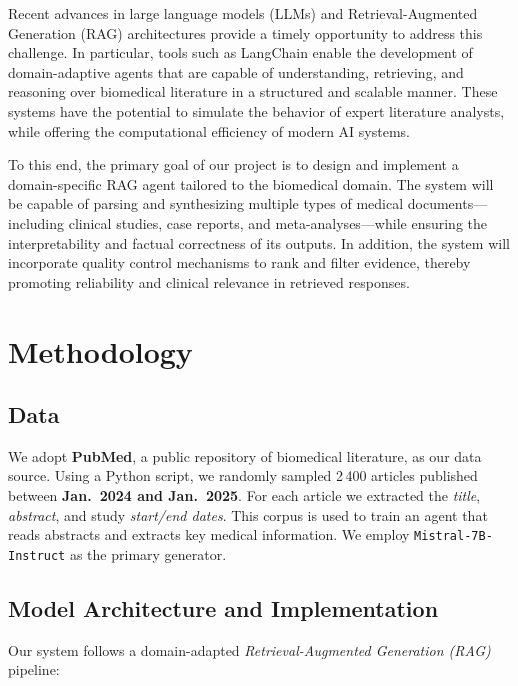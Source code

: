\documentclass[conference]{IEEEtran}
\begin{document}
Recent advances in large language models (LLMs) and Retrieval-Augmented Generation (RAG) architectures provide a timely opportunity to address this challenge. In particular, tools such as LangChain enable the development of domain-adaptive agents that are capable of understanding, retrieving, and reasoning over biomedical literature in a structured and scalable manner. These systems have the potential to simulate the behavior of expert literature analysts, while offering the computational efficiency of modern AI systems.

To this end, the primary goal of our project is to design and implement a domain-specific RAG agent tailored to the biomedical domain. The system will be capable of parsing and synthesizing multiple types of medical documents---including clinical studies, case reports, and meta-analyses---while ensuring the interpretability and factual correctness of its outputs. In addition, the system will incorporate quality control mechanisms to rank and filter evidence, thereby promoting reliability and clinical relevance in retrieved responses.

\section{Methodology}
\subsection{Data}
We adopt \textbf{PubMed}\cite{pubmed_site}, a public repository of biomedical literature, as our data source.
Using a Python script, we randomly sampled 2\,400 articles published between \textbf{Jan.~2024 and Jan.~2025}.  
For each article we extracted the \emph{title}, \emph{abstract}, and study \emph{start/end dates}.  
This corpus is used to train an agent that reads abstracts and extracts key medical information. We employ \texttt{Mistral-7B-Instruct}\cite{mistral7b_announce} as the primary generator.

\subsection{Model Architecture and Implementation}
Our system follows a domain-adapted \emph{Retrieval-Augmented Generation (RAG)} pipeline\cite{zhihu_ragas}:
\end{document}
